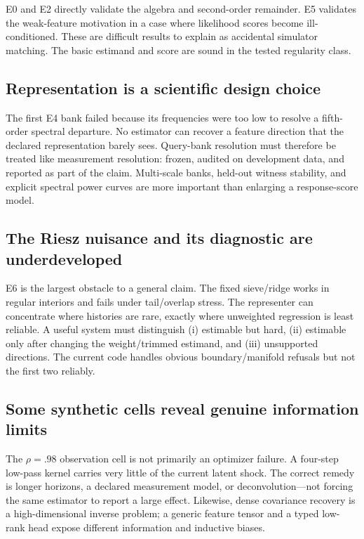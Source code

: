 \documentclass[11pt]{article}
\begin{document}
E0 and E2 directly validate the algebra and second-order remainder.  E5 validates the weak-feature motivation in a case where likelihood scores become ill-conditioned.  These are difficult results to explain as accidental simulator matching.  The basic estimand and score are sound in the tested regularity class.

\subsection{Representation is a scientific design choice}

The first E4 bank failed because its frequencies were too low to resolve a fifth-order spectral departure.  No estimator can recover a feature direction that the declared representation barely sees.  Query-bank resolution must therefore be treated like measurement resolution: frozen, audited on development data, and reported as part of the claim.  Multi-scale banks, held-out witness stability, and explicit spectral power curves are more important than enlarging a response-score model.

\subsection{The Riesz nuisance and its diagnostic are underdeveloped}

E6 is the largest obstacle to a general claim.  The fixed sieve/ridge works in regular interiors and fails under tail/overlap stress.  The representer can concentrate where histories are rare, exactly where unweighted regression is least reliable.  A useful system must distinguish (i) estimable but hard, (ii) estimable only after changing the weight/trimmed estimand, and (iii) unsupported directions.  The current code handles obvious boundary/manifold refusals but not the first two reliably.

\subsection{Some synthetic cells reveal genuine information limits}

The $\rho=.98$ observation cell is not primarily an optimizer failure.  A four-step low-pass kernel carries very little of the current latent shock.  The correct remedy is longer horizons, a declared measurement model, or deconvolution---not forcing the same estimator to report a large effect.  Likewise, dense covariance recovery is a high-dimensional inverse problem; a generic feature tensor and a typed low-rank head expose different information and inductive biases.
\end{document}
